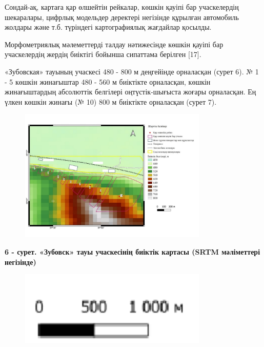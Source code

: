 Сондай-ақ, картаға қар өлшейтін рейкалар, көшкін қауіпі бар учаскелердің
шекаралары, цифрлық модельдер деректері негізінде құрылған автомобиль
жолдары және т.б. түріндегі картографиялық жағдайлар қосылды.

Морфометриялық мәлеметтерді талдау нәтижесінде көшкін қауіпі бар
учаскелердің жердің биіктігі бойынша сипаттама берілген {[}17{]}.

«Зубовская» тауының учаскесі 480 - 800 м деңгейінде орналасқан (сурет
6). № 1 - 5 көшкін жинағыштар 480 - 560 м биіктікте орналасқан, көшкін
жинағыштардың абсолюттік белгілері оңтүстік-шығыста жоғары орналасқан.
Ең үлкен көшкін жинағы (№ 10) 800 м биіктікте орналасқан (сурет 7).


\begin{figure}[H]
	\centering
	\includegraphics[width=0.8\textwidth]{media/ict2/image208}
	\caption*{}
\end{figure}


{\bfseries 6 - сурет. «Зубовск» тауы учаскесінің биіктік картасы (SRTM
мәліметтері негізінде)}


\begin{figure}[H]
	\centering
	\includegraphics[width=0.8\textwidth]{media/ict2/image209}
	\caption*{}
\end{figure}

